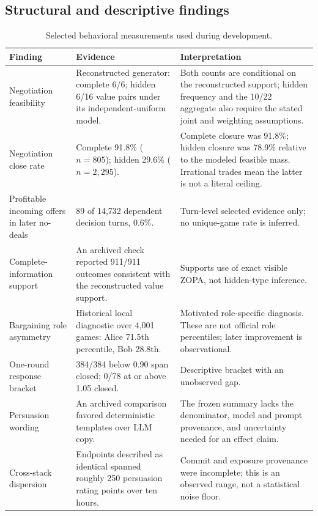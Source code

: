 \subsection{Structural and descriptive findings}

\begin{table}[h]
\centering
\small
\caption{Selected behavioral measurements used during development.}
\label{tab:full_findings}
\begin{tabularx}{\linewidth}{@{}p{3.4cm}p{4.0cm}Y@{}}
\toprule
Finding & Evidence & Interpretation \\
\midrule
Negotiation feasibility & Reconstructed generator: complete 6/6; hidden 6/16 value pairs under its independent-uniform model. & Both counts are conditional on the reconstructed support; hidden frequency and the 10/22 aggregate also require the stated joint and weighting assumptions. \\
Negotiation close rate & Complete 91.8\% ($n=805$); hidden 29.6\% ($n=2{,}295$). & Complete closure was 91.8\%; hidden closure was 78.9\% relative to the modeled feasible mass. Irrational trades mean the latter is not a literal ceiling. \\
Profitable incoming offers in later no-deals & 89 of 14,732 dependent decision turns, 0.6\%. & Turn-level selected evidence only; no unique-game rate is inferred. \\
Complete-information support & An archived check reported 911/911 outcomes consistent with the reconstructed value support. & Supports use of exact visible ZOPA, not hidden-type inference. \\
Bargaining role asymmetry & Historical local diagnostic over 4,001 games: Alice 71.5th percentile, Bob 28.8th. & Motivated role-specific diagnosis. These are not official role percentiles; later improvement is observational. \\
One-round response bracket & 384/384 below 0.90 span closed; 0/78 at or above 1.05 closed. & Descriptive bracket with an unobserved gap. \\
Persuasion wording & An archived comparison favored deterministic templates over LLM copy. & The frozen summary lacks the denominator, model and prompt provenance, and uncertainty needed for an effect claim. \\
Cross-stack dispersion & Endpoints described as identical spanned roughly 250 persuasion rating points over ten hours. & Commit and exposure provenance were incomplete; this is an observed range, not a statistical noise floor. \\
\bottomrule
\end{tabularx}
\end{table}

